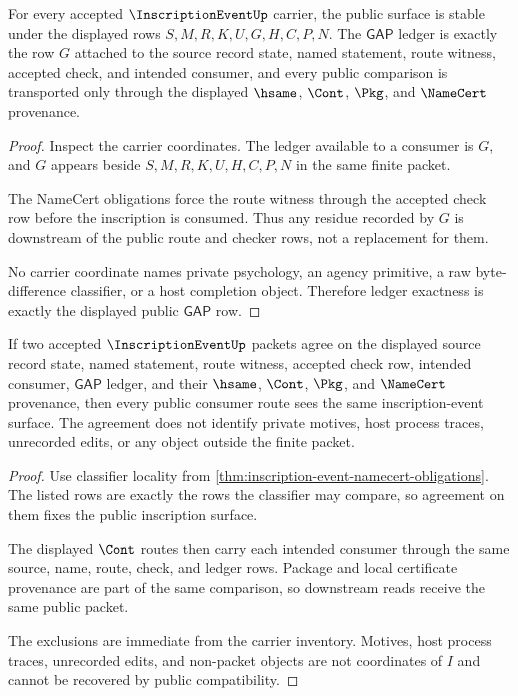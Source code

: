 \begin{theorem}
\label{thm:inscription-event-carrier-stability}
For every accepted $\InscriptionEventUp$ carrier, the public surface is stable under the displayed rows $S,M,R,K,U,G,H,C,P,N$. The $\mathsf{GAP}$ ledger is exactly the row $G$ attached to the source record state, named statement, route witness, accepted check, and intended consumer, and every public comparison is transported only through the displayed $\hsame$, $\Cont$, $\Pkg$, and $\NameCert$ provenance.
\end{theorem}
\begin{proof}
Inspect the carrier coordinates. The ledger available to a consumer is $G$, and $G$ appears beside $S,M,R,K,U,H,C,P,N$ in the same finite packet.

The NameCert obligations force the route witness through the accepted check row before the inscription is consumed. Thus any residue recorded by $G$ is downstream of the public route and checker rows, not a replacement for them.

No carrier coordinate names private psychology, an agency primitive, a raw byte-difference classifier, or a host completion object. Therefore ledger exactness is exactly the displayed public $\mathsf{GAP}$ row.
\end{proof}

\begin{theorem}
\label{thm:inscription-event-nonescape-boundary}
If two accepted $\InscriptionEventUp$ packets agree on the displayed source record state, named statement, route witness, accepted check row, intended consumer, $\mathsf{GAP}$ ledger, and their $\hsame$, $\Cont$, $\Pkg$, and $\NameCert$ provenance, then every public consumer route sees the same inscription-event surface. The agreement does not identify private motives, host process traces, unrecorded edits, or any object outside the finite packet.
\end{theorem}
\begin{proof}
Use classifier locality from \autoref{thm:inscription-event-namecert-obligations}. The listed rows are exactly the rows the classifier may compare, so agreement on them fixes the public inscription surface.

The displayed $\Cont$ routes then carry each intended consumer through the same source, name, route, check, and ledger rows. Package and local certificate provenance are part of the same comparison, so downstream reads receive the same public packet.

The exclusions are immediate from the carrier inventory. Motives, host process traces, unrecorded edits, and non-packet objects are not coordinates of $I$ and cannot be recovered by public compatibility.
\end{proof}

